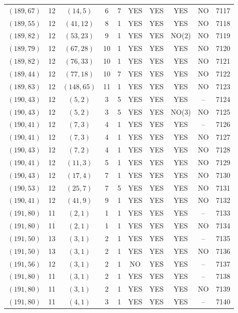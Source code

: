 \begin{longtable}{|c|c|c|c|c|c|c|c|c|c|}
$(189, 67)$ & 12 & $(14, 5)$ & 6 & 7 & YES & YES & YES & NO & 7117\\
$(189, 55)$ & 12 & $(41, 12)$ & 8 & 1 & YES & YES & YES & NO & 7118\\
$(189, 82)$ & 12 & $(53, 23)$ & 9 & 1 & YES & YES & NO(2) & NO & 7119\\
$(189, 79)$ & 12 & $(67, 28)$ & 10 & 1 & YES & YES & YES & NO & 7120\\
$(189, 82)$ & 12 & $(76, 33)$ & 10 & 1 & YES & YES & YES & NO & 7121\\
$(189, 44)$ & 12 & $(77, 18)$ & 10 & 7 & YES & YES & YES & NO & 7122\\
$(189, 83)$ & 12 & $(148, 65)$ & 11 & 1 & YES & YES & YES & NO & 7123\\
$(190, 43)$ & 12 & $(5, 2)$ & 3 & 5 & YES & YES & YES & -- & 7124\\
$(190, 43)$ & 12 & $(5, 2)$ & 3 & 5 & YES & YES & NO(3) & NO & 7125\\
$(190, 41)$ & 12 & $(7, 3)$ & 4 & 1 & YES & YES & YES & -- & 7126\\
$(190, 41)$ & 12 & $(7, 3)$ & 4 & 1 & YES & YES & YES & NO & 7127\\
$(190, 43)$ & 12 & $(7, 2)$ & 4 & 1 & YES & YES & YES & NO & 7128\\
$(190, 41)$ & 12 & $(11, 3)$ & 5 & 1 & YES & YES & YES & NO & 7129\\
$(190, 43)$ & 12 & $(17, 4)$ & 7 & 1 & YES & YES & YES & NO & 7130\\
$(190, 53)$ & 12 & $(25, 7)$ & 7 & 5 & YES & YES & YES & NO & 7131\\
$(190, 41)$ & 12 & $(41, 9)$ & 9 & 1 & YES & YES & YES & NO & 7132\\
$(191, 80)$ & 11 & $(2, 1)$ & 1 & 1 & YES & YES & YES & -- & 7133\\
$(191, 80)$ & 11 & $(2, 1)$ & 1 & 1 & YES & YES & YES & NO & 7134\\
$(191, 50)$ & 13 & $(3, 1)$ & 2 & 1 & YES & YES & YES & -- & 7135\\
$(191, 50)$ & 13 & $(3, 1)$ & 2 & 1 & YES & YES & YES & NO & 7136\\
$(191, 56)$ & 12 & $(3, 1)$ & 2 & 1 & NO & YES & YES & -- & 7137\\
$(191, 80)$ & 11 & $(3, 1)$ & 2 & 1 & YES & YES & YES & -- & 7138\\
$(191, 80)$ & 11 & $(3, 1)$ & 2 & 1 & YES & YES & YES & NO & 7139\\
$(191, 80)$ & 11 & $(4, 1)$ & 3 & 1 & YES & YES & YES & -- & 7140\\

\end{longtable}
